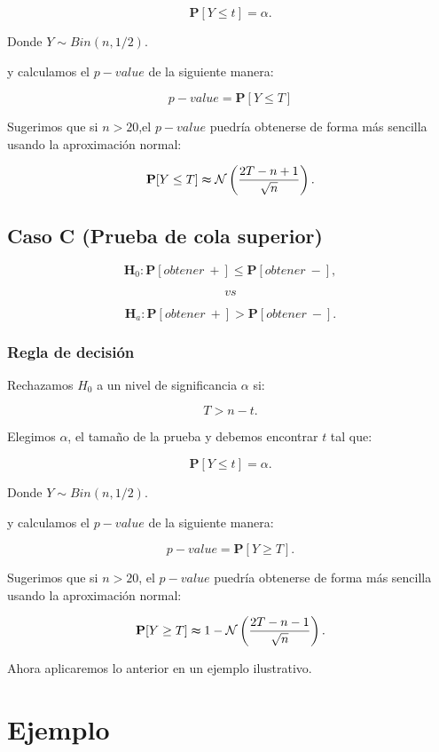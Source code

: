\documentclass[
  a4paper,
  oneside,
  openany]{book}
\begin{document}
\[\mathbf{P}[Y \leq t]=\alpha.\]

Donde \(Y \sim Bin (n,1/2)\).

y calculamos el \(p-value\) de la siguiente manera:

\[p-value=\mathbf{P}[Y\leq T]\]

Sugerimos que si \(n > 20\),el \(p-value\) puedría obtenerse de forma más sencilla usando la aproximación normal:

\[\mathbf{P}[Y\leq T] \thickapprox  \mathcal{N} \left(\frac{2T-n+1}{\sqrt{n}}\right).\]

\hypertarget{caso-c-prueba-de-cola-superior-2}{%
\subsection*{Caso C (Prueba de cola superior)}\label{caso-c-prueba-de-cola-superior-2}}


\[\textbf{H}_0: \mathbf{P}[obtener\ +] \leq \mathbf{P}[obtener\ -],\]

\[vs\]

\[\textbf{H}_a: \mathbf{P}[obtener\ +] > \mathbf{P}[obtener\ -].\]

\hypertarget{regla-de-decisiuxf3n-8}{%
\subsubsection*{Regla de decisión}\label{regla-de-decisiuxf3n-8}}


Rechazamos \(H_0\) a un nivel de significancia \(\alpha\) si:

\[T > n-t.\]

Elegimos \(\alpha\), el tamaño de la prueba y debemos encontrar \(t\) tal que:

\[\mathbf{P}[Y \leq t]=\alpha.\]

Donde \(Y \sim Bin (n,1/2)\).

y calculamos el \(p-value\) de la siguiente manera:

\[p-value=\mathbf{P}[Y\geq T].\]

Sugerimos que si \(n > 20\), el \(p-value\) puedría obtenerse de forma más sencilla usando la aproximación normal:

\[\mathbf{P}[Y\geq T] \thickapprox 1- \mathcal{N} \left(\frac{2T-n-1}{\sqrt{n}}\right).\]

Ahora aplicaremos lo anterior en un ejemplo ilustrativo.

\hypertarget{ejemplo-2}{%
\section{Ejemplo}\label{ejemplo-2}}
\end{document}

